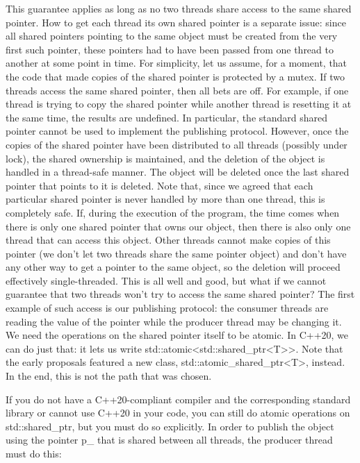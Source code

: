 This guarantee applies as long as no two threads share access to the same shared pointer. How to get each thread its own shared pointer is a separate issue: since all shared pointers pointing to the same object must be created from the very first such pointer, these pointers had to have been passed from one thread to another at some point in time. For simplicity, let us assume, for a moment, that the code that made copies of the shared pointer is protected by a mutex. If two threads access the same shared pointer, then all bets are off. For example, if one thread is trying to copy the shared pointer while another thread is resetting it at the same time, the results are undefined. In particular, the standard shared pointer cannot be used to implement the publishing protocol. However, once the copies of the shared pointer have been distributed to all threads (possibly under lock), the shared ownership is maintained, and the deletion of the object is handled in a thread-safe manner. The object will be deleted once the last shared pointer that points to it is deleted. Note that, since we agreed that each particular shared pointer is never handled by more than one thread, this is completely safe. If, during the execution of the program, the time comes when there is only one shared pointer that owns our object, then there is also only one thread that can access this object. Other threads cannot make copies of this pointer (we don't let two threads share the same pointer object) and don't have any other way to get a pointer to the same object, so the deletion will proceed effectively single-threaded. This is all well and good, but what if we cannot guarantee that two threads won't try to access the same shared pointer? The first example of such access is our publishing protocol: the consumer threads are reading the value of the pointer while the producer thread may be changing it. We need the operations on the shared pointer itself to be atomic. In C++20, we can do just that: it lets us write std::atomic<std::shared\_ptr<T>>. Note that the early proposals featured a new class, std::atomic\_shared\_ptr<T>, instead. In the end, this is not the path that was chosen.

If you do not have a C++20-compliant compiler and the corresponding standard library or cannot use C++20 in your code, you can still do atomic operations on std::shared\_ptr, but you must do so explicitly. In order to publish the object using the pointer p\_ that is shared between all threads, the producer thread must do this:

